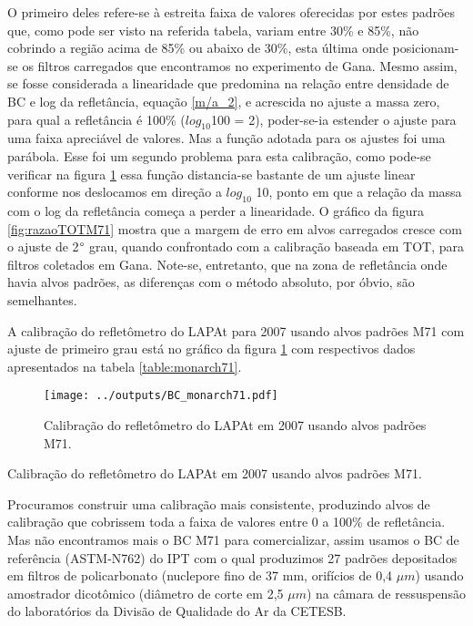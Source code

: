 O primeiro deles refere-se à estreita faixa de valores oferecidas por estes 
padrões que, como pode ser visto na referida tabela, variam entre 30\% e 85\%, 
não cobrindo a região acima de 85\% ou abaixo de 30\%, esta última onde 
posicionam-se os filtros carregados que encontramos no experimento de Gana. 
Mesmo assim, se fosse considerada a linearidade que predomina na relação 
entre densidade de BC e log da refletância, equação \ref{m/a_2}, e acrescida 
no ajuste a massa zero, para qual a refletância é 100\% ($log_{10}$100 = 2), 
poder-se-ia estender o ajuste para uma faixa apreciável de valores.
Mas a função adotada para os ajustes foi uma parábola. Esse foi um segundo 
problema para esta calibração, como pode-se verificar na figura 
\ref{fig:monarch71} essa função distancia-se bastante de um ajuste linear 
conforme nos deslocamos em direção a $log_{10}$ 10, ponto em que a relação da 
massa com o log da refletância começa a perder a linearidade. O gráfico da 
figura \ref{fig:razaoTOTM71} mostra que a margem de erro em alvos carregados 
cresce com o ajuste de 2$\degree$ grau, quando confrontado com a calibração 
baseada em TOT, para filtros coletados em Gana. Note-se, entretanto, que na 
zona de refletância onde havia alvos padrões, as diferenças com o método 
absoluto, por óbvio, são semelhantes. 

A calibração do refletômetro do LAPAt para 2007 usando alvos padrões M71 com 
ajuste de primeiro grau está no gráfico da figura \ref{fig:monarch71} com 
respectivos dados apresentados na tabela \ref{table:monarch71}.

\begin{figure}[H]
  \centering
  \texttt{[image: ../outputs/BC\_monarch71.pdf]}
  \caption{Calibração do refletômetro do LAPAt em 2007 usando alvos padrões M71.
         \label{fig:monarch71}}
\end{figure}

\newpage
\begin{table}[H]
  \centering
  \small
    
    \caption{Calibração do refletômetro do LAPAt em 2007 usando alvos padrões 
             M71. \label{table:monarch71}}
\end{table}

Procuramos construir uma calibração mais consistente, produzindo alvos de 
calibração que cobrissem toda a faixa de valores entre 0 a 100\% de refletância. 
Mas não encontramos mais o BC M71 para comercializar, assim usamos o BC de 
referência (ASTM-N762) do IPT com o qual produzimos 27 padrões depositados em 
filtros de policarbonato (nuclepore fino de 37 mm, orifícios de 0,4 $\mu m$) 
usando amostrador dicotômico (diâmetro de corte em 2,5 $\mu m$) na câmara de 
ressuspensão do laboratórios da Divisão de Qualidade do Ar da CETESB.

